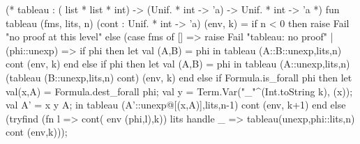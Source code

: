 (* tableau : ( list *  list * int) ->
                (Unif. * int -> 'a) ->
                Unif. * int -> 'a *)
fun tableau (fms, lits, n) (cont : Unif. * int -> 'a) (env, k) =
  if n < 0 then raise Fail "no proof at this level"
  else
    (case fms of
      [] => raise Fail "tableau: no proof"
    | (phi::unexp) =>
        if  phi
        then let val (A,B) =  phi
             in tableau (A::B::unexp,lits,n) cont (env, k) end
        else if  phi
        then let val (A,B) =  phi
             in tableau (A::unexp,lits,n)
                        (tableau (B::unexp,lits,n) cont)
                        (env, k)
             end
        else if Formula.is_forall phi
        then let val(x,A) = Formula.dest_forall phi;
                 val y = Term.Var("_"^(Int.toString k), (x));
                 val A' =  x y A;
             in tableau (A'::unexp@[(x,A)],lits,n-1) cont (env, k+1) end
        else
         (tryfind (fn l => cont( env (phi,l),k))
                  lits
         handle _ => tableau(unexp,phi::lits,n) cont (env,k)));
